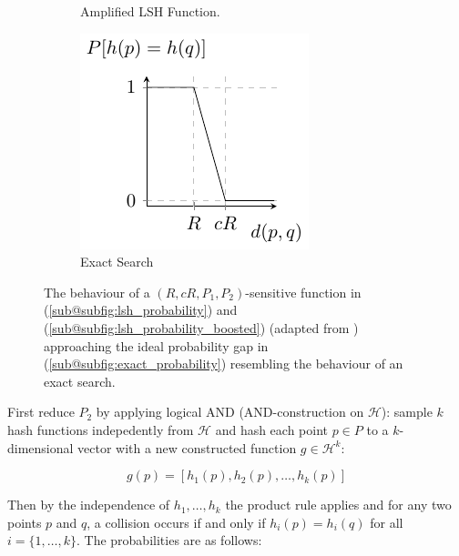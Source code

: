 \begin{figure}
\begin{subfigure}[b]{0.3\textwidth}
        \caption{Amplified LSH Function.}
        \label{subfig:lsh_probability_boosted}
        \end{subfigure}
        \hfill
        \begin{subfigure}[b]{0.3\textwidth}
            \centering
            \includegraphics[width=\textwidth]{tikz/exact_probability.pdf}
            \caption{Exact Search}
            \label{subfig:exact_probability}
    \end{subfigure}
    \caption{The behaviour of a $(R, cR, P_1, P_2)$-sensitive function in (\ref{sub@subfig:lsh_probability}) and (\ref{sub@subfig:lsh_probability_boosted}) (adapted from \cite[100]{leskovec_rajaraman_ullman_2014}) approaching the ideal probability gap in (\ref{sub@subfig:exact_probability}) resembling the behaviour of an exact search.}
    \label{fig:lsh_probability}
\end{figure}

First reduce $P_2$ by applying logical AND (AND-construction on $\mathcal{H}$): sample $k$ hash functions indepedently from $\mathcal{H}$ and hash each point $p \in P$ to a $k$-dimensional vector with a new constructed function $g \in \mathcal{H}^k$:

\begin{equation}
    g(p) = [h_1(p), h_2(p), \dots, h_k(p)]
\end{equation}


Then by the independence of $h_1, \dots, h_k$ the product rule applies and for any two points $p$ and $q$, a collision occurs if and only if $h_i(p)=h_i(q)$ for all $i = \{1, \dots, k\}$. The probabilities are as follows:

